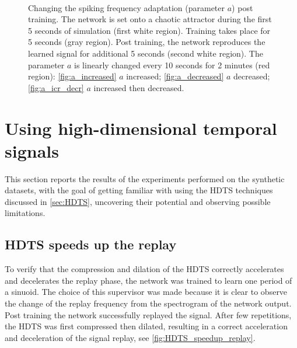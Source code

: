 \documentclass[10pt,a4paper, final]{report} %
\begin{document}
\begin{figure}[H]
\centering
{}
\\


\caption{Changing the spiking frequency adaptation (parameter $a$) post training. The network is set onto a chaotic attractor during the first 5 seconds of simulation (first white region). Training takes place for 5 seconds (gray region). Post training, the network reproduces the learned signal for additional 5 seconds (second white region). The parameter $a$ is linearly changed every 10 seconds for 2 minutes (red region): \autoref{fig:a_increased} $a$ increased; \autoref{fig:a_decreased} $a$ decreased; \autoref{fig:a_icr_decr} $a$ increased then decreased.}
\label{fig:change_a_control_frequency}
\end{figure}

\section{Using high-dimensional temporal signals}
\label{sec:HDTS_synthetic_datasets}
This section reports the results of the experiments performed on the synthetic datasets, with the goal of getting familiar with using the HDTS techniques discussed in \autoref{sec:HDTS}, uncovering their potential and observing possible limitations.

\subsection{HDTS speeds up the replay}
To verify that the compression and dilation of the HDTS correctly accelerates and decelerates the replay phase, the network was trained to learn one period of a sinuoid. The choice of this supervisor was made because it is clear to observe the change of the replay frequency from the spectrogram of the network output. Post training the network successfully replayed the signal. After few repetitions, the HDTS was first compressed then dilated, resulting in a correct acceleration and deceleration of the signal replay, see \autoref{fig:HDTS_speedup_replay}. 
\end{document}
